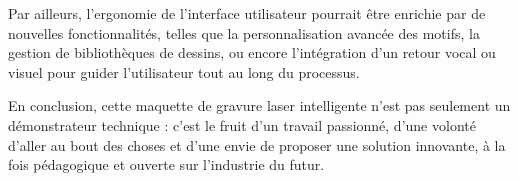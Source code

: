 Par ailleurs, l’ergonomie de l’interface utilisateur pourrait être enrichie par de nouvelles fonctionnalités, telles que la personnalisation avancée des motifs, la gestion de bibliothèques de dessins, ou encore l’intégration d’un retour vocal ou visuel pour guider l’utilisateur tout au long du processus.

En conclusion, cette maquette de gravure laser intelligente n'est pas seulement un démonstrateur technique : c'est le fruit d'un travail passionné, d'une volonté d'aller au bout des choses et d'une envie de proposer une solution innovante, à la fois pédagogique et ouverte sur l'industrie du futur.

\vspace*{2cm}
\begin{flushright}
    \makeatletter\@author\makeatother

    \begin{minipage}{5cm}
        \printsignature
    \end{minipage}
\end{flushright}